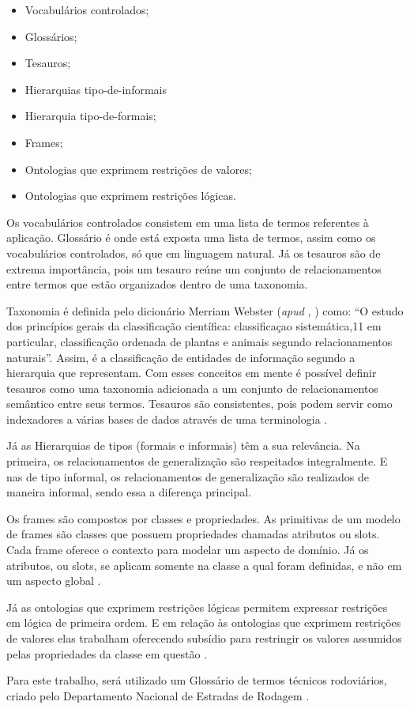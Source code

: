 \begin{itemize}
\item Vocabulários controlados;
\item Glossários;
\item Tesauros;
\item Hierarquias tipo-de-informais
\item Hierarquia tipo-de-formais;
\item Frames;
\item Ontologias que exprimem restrições de valores;
\item Ontologias que exprimem restrições lógicas.
\end{itemize}

Os vocabulários controlados consistem em uma lista de termos referentes à aplicação.
Glossário é onde está exposta uma lista de termos, assim como os vocabulários controlados,
só que em linguagem natural. Já os tesauros são de extrema importância, pois um tesauro
reúne um conjunto de relacionamentos entre termos que estão organizados dentro de uma
taxonomia.

Taxonomia é definida pelo dicionário Merriam Webster (\textit{apud} \citeauthor{breitman05}, \citeyear{breitman05})
como: “O estudo dos princípios gerais da classificação científica: classificaçao sistemática,11
em particular, classificação ordenada de plantas e animais segundo relacionamentos naturais”.
Assim, é a classificação de entidades de informação segundo a hierarquia que representam.
Com esses conceitos em mente é possível definir tesauros como uma taxonomia adicionada a
um conjunto de relacionamentos semântico entre seus termos. Tesauros são consistentes, pois
podem servir como indexadores a várias bases de dados através de uma terminologia
\cite{breitman05}.

Já as Hierarquias de tipos (formais e informais) têm a sua relevância. Na primeira, os
relacionamentos de generalização são respeitados integralmente. E nas de tipo informal, os
relacionamentos de generalização são realizados de maneira informal, sendo essa a diferença
principal.

Os frames são compostos por classes e propriedades. As primitivas de um modelo de
frames são classes que possuem propriedades chamadas atributos ou slots. Cada frame oferece
o contexto para modelar um aspecto de domínio. Já os atributos, ou slots, se aplicam somente
na classe a qual foram definidas, e não em um aspecto global \cite{breitman05}.

Já as ontologias que exprimem restrições lógicas permitem expressar restrições em
lógica de primeira ordem. E em relação às ontologias que exprimem restrições de valores elas
trabalham oferecendo subsídio para restringir os valores assumidos pelas propriedades da
classe em questão \cite{breitman05}.

Para este trabalho, será utilizado um Glossário de termos técnicos rodoviários, criado
pelo Departamento Nacional de Estradas de Rodagem \cite{brasil97}.


